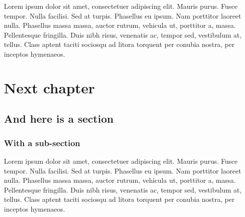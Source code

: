\documentclass[11pt,a4paper,twoside,openright, abstractoff,titlepage,final,parskip=half*,BCOR10mm]{scrreprt}%
\begin{document}
Lorem ipsum dolor sit amet, consectetuer adipiscing elit. Mauris
purus. Fusce tempor. Nulla facilisi. Sed at turpis. Phasellus eu
ipsum. Nam porttitor laoreet nulla. Phasellus massa massa, auctor
rutrum, vehicula ut, porttitor a, massa. Pellentesque fringilla. Duis
nibh risus, venenatis ac, tempor sed, vestibulum at, tellus. Class
aptent taciti sociosqu ad litora torquent per conubia nostra, per
inceptos hymenaeos.


\cleardoublepage

\chapter{Next chapter}    %

\section{And here is a section}

\subsection{With a sub-section}

Lorem ipsum dolor sit amet, consectetuer adipiscing elit. Mauris
purus. Fusce tempor. Nulla facilisi. Sed at turpis. Phasellus eu
ipsum. Nam porttitor laoreet nulla. Phasellus massa massa, auctor
rutrum, vehicula ut, porttitor a, massa. Pellentesque fringilla. Duis
nibh risus, venenatis ac, tempor sed, vestibulum at, tellus. Class
aptent taciti sociosqu ad litora torquent per conubia nostra, per
inceptos hymenaeos.







\thispagestyle{empty}
\cleardoublepage


\end{document}
